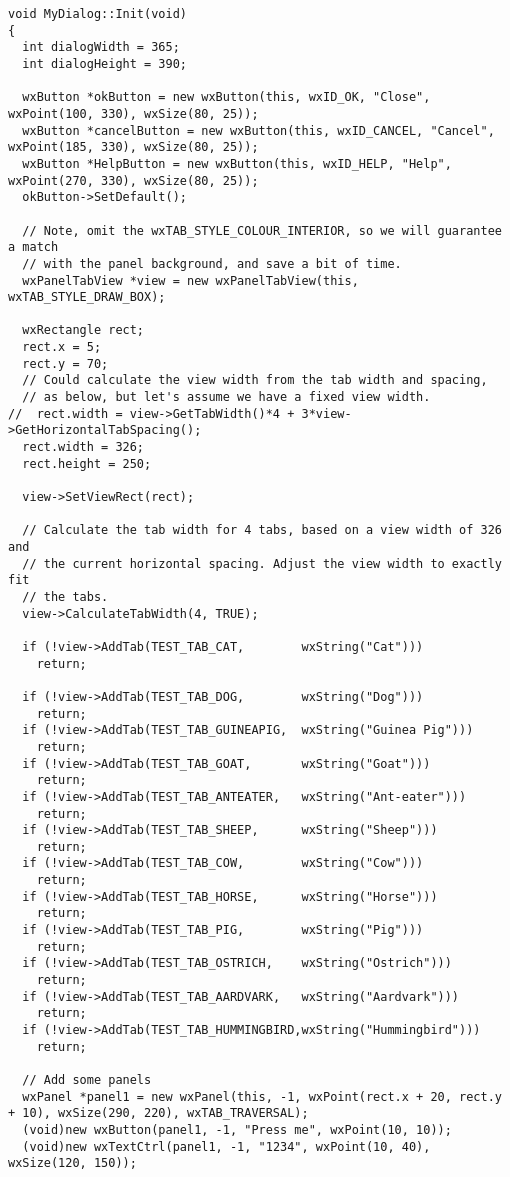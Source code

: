 {\small
\begin{verbatim}
void MyDialog::Init(void)
{
  int dialogWidth = 365;
  int dialogHeight = 390;
  
  wxButton *okButton = new wxButton(this, wxID_OK, "Close", wxPoint(100, 330), wxSize(80, 25));
  wxButton *cancelButton = new wxButton(this, wxID_CANCEL, "Cancel", wxPoint(185, 330), wxSize(80, 25));
  wxButton *HelpButton = new wxButton(this, wxID_HELP, "Help", wxPoint(270, 330), wxSize(80, 25));
  okButton->SetDefault();

  // Note, omit the wxTAB_STYLE_COLOUR_INTERIOR, so we will guarantee a match
  // with the panel background, and save a bit of time.
  wxPanelTabView *view = new wxPanelTabView(this, wxTAB_STYLE_DRAW_BOX);

  wxRectangle rect;
  rect.x = 5;
  rect.y = 70;
  // Could calculate the view width from the tab width and spacing,
  // as below, but let's assume we have a fixed view width.
//  rect.width = view->GetTabWidth()*4 + 3*view->GetHorizontalTabSpacing();
  rect.width = 326;
  rect.height = 250;
  
  view->SetViewRect(rect);

  // Calculate the tab width for 4 tabs, based on a view width of 326 and
  // the current horizontal spacing. Adjust the view width to exactly fit
  // the tabs.
  view->CalculateTabWidth(4, TRUE);

  if (!view->AddTab(TEST_TAB_CAT,        wxString("Cat")))
    return;

  if (!view->AddTab(TEST_TAB_DOG,        wxString("Dog")))
    return;
  if (!view->AddTab(TEST_TAB_GUINEAPIG,  wxString("Guinea Pig")))
    return;
  if (!view->AddTab(TEST_TAB_GOAT,       wxString("Goat")))
    return;
  if (!view->AddTab(TEST_TAB_ANTEATER,   wxString("Ant-eater")))
    return;
  if (!view->AddTab(TEST_TAB_SHEEP,      wxString("Sheep")))
    return;
  if (!view->AddTab(TEST_TAB_COW,        wxString("Cow")))
    return;
  if (!view->AddTab(TEST_TAB_HORSE,      wxString("Horse")))
    return;
  if (!view->AddTab(TEST_TAB_PIG,        wxString("Pig")))
    return;
  if (!view->AddTab(TEST_TAB_OSTRICH,    wxString("Ostrich")))
    return;
  if (!view->AddTab(TEST_TAB_AARDVARK,   wxString("Aardvark")))
    return;
  if (!view->AddTab(TEST_TAB_HUMMINGBIRD,wxString("Hummingbird")))
    return;
    
  // Add some panels
  wxPanel *panel1 = new wxPanel(this, -1, wxPoint(rect.x + 20, rect.y + 10), wxSize(290, 220), wxTAB_TRAVERSAL);
  (void)new wxButton(panel1, -1, "Press me", wxPoint(10, 10));
  (void)new wxTextCtrl(panel1, -1, "1234", wxPoint(10, 40), wxSize(120, 150));
  

\end{verbatim}}
